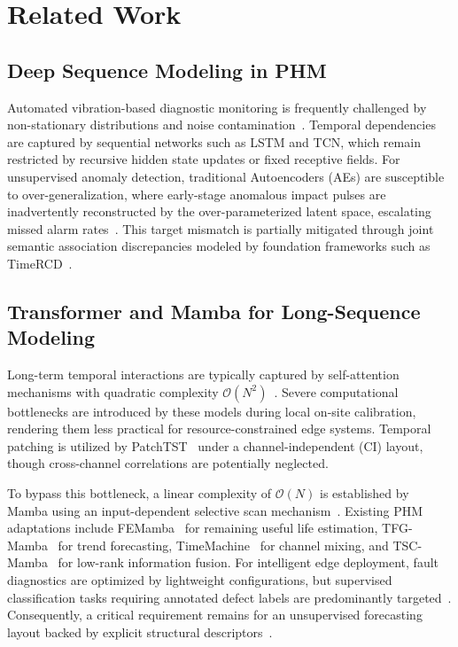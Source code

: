\documentclass[runningheads]{llncs}
\begin{document}
\section{Related Work} \label{sect:s2}

\subsection{Deep Sequence Modeling in PHM} \label{sect:s2dot1}
 Automated vibration-based diagnostic monitoring is frequently challenged by non-stationary distributions and noise contamination~\cite{ref-1}. Temporal dependencies are captured by sequential networks such as LSTM and TCN, which remain restricted by recursive hidden state updates or fixed receptive fields. For unsupervised anomaly detection, traditional Autoencoders (AEs) are susceptible to over-generalization, where early-stage anomalous impact pulses are inadvertently reconstructed by the over-parameterized latent space, escalating missed alarm rates~\cite{ref-12}. This target mismatch is partially mitigated through joint semantic association discrepancies modeled by foundation frameworks such as TimeRCD~\cite{ref-12}.

\subsection{Transformer and Mamba for Long-Sequence Modeling} \label{sect:s2dot2}
Long-term temporal interactions are typically captured by self-attention mechanisms with quadratic complexity $\mathcal{O}(N^2)$~\cite{ref-2,ref-3}. Severe computational bottlenecks are introduced by these models during local on-site calibration, rendering them less practical for resource-constrained edge systems. Temporal patching is utilized by PatchTST~\cite{ref-4} under a channel-independent (CI) layout, though cross-channel correlations are potentially neglected.

 To bypass this bottleneck, a linear complexity of $\mathcal{O}(N)$ is established by Mamba using an input-dependent selective scan mechanism~\cite{ref-5}. Existing PHM adaptations include FEMamba~\cite{ref-6} for remaining useful life estimation, TFG-Mamba~\cite{ref-7} for trend forecasting, TimeMachine~\cite{ref-8} for channel mixing, and TSC-Mamba~\cite{ref-13} for low-rank information fusion. For intelligent edge deployment, fault diagnostics are optimized by lightweight configurations, but supervised classification tasks requiring annotated defect labels are predominantly targeted~\cite{ref-14,ref-15,ref-16}. Consequently, a critical requirement remains for an unsupervised forecasting layout backed by explicit structural descriptors~\cite{ref-9,ref-17}.
\end{document}
